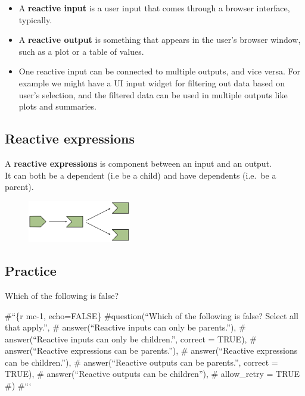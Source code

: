 \documentclass[
  letterpaper,
  DIV=11,
  numbers=noendperiod]{scrreprt}
\providecommand{\tightlist}{%
  \setlength{\itemsep}{0pt}\setlength{\parskip}{0pt}}
\begin{document}
\begin{itemize}
\tightlist
\item
  A \textbf{reactive input} is a user input that comes through a browser
  interface, typically.
\item
  A \textbf{reactive output} is something that appears in the user's
  browser window, such as a plot or a table of values.
\item
  One reactive input can be connected to multiple outputs, and vice
  versa. For example we might have a UI input widget for filtering out
  data based on user's selection, and the filtered data can be used in
  multiple outputs like plots and summaries.
\end{itemize}

\hypertarget{reactive-expressions}{%
\subsection{Reactive expressions}\label{reactive-expressions}}

A \textbf{reactive expressions} is component between an input and an
output.\\
It can both be a dependent (i.e be a child) and have dependents (i.e.~be
a parent).

\begin{figure}

{\centering \includegraphics[width=0.4\textwidth,height=\textheight]{./images/input-expression-outputs.png}

}

\end{figure}

\hypertarget{practice}{%
\subsection{Practice}\label{practice}}

Which of the following is false?

\#``\{r mc-1, echo=FALSE\} \#question(``Which of the following is false?
Select all that apply.'', \# answer(``Reactive inputs can only be
parents.''), \# answer(``Reactive inputs can only be children.'',
correct = TRUE), \# answer(``Reactive expressions can be parents.''), \#
answer(``Reactive expressions can be children.''), \# answer(``Reactive
outputs can be parents.'', correct = TRUE), \# answer(``Reactive outputs
can be children''), \# allow\_retry = TRUE \#) \#```
\end{document}
